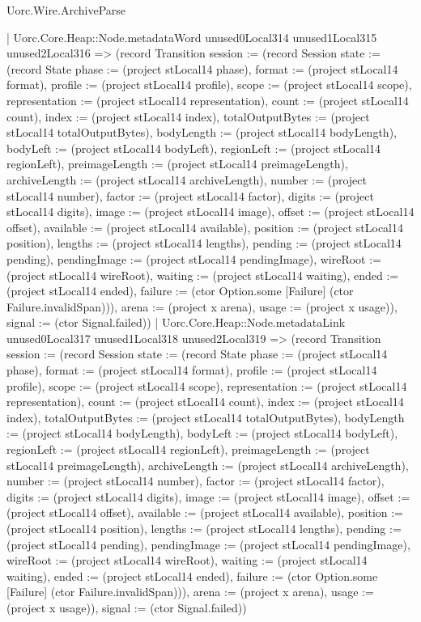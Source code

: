 \begin{lexlean}{Uorc.Wire.ArchiveParse}
\begin{semanticmodule}
{            | Uorc.Core.Heap::Node.metadataWord unused0Local314 unused1Local315 unused2Local316 => (record Transition {session := (record Session {state := (record State {phase := (project stLocal14 phase), format := (project stLocal14 format), profile := (project stLocal14 profile), scope := (project stLocal14 scope), representation := (project stLocal14 representation), count := (project stLocal14 count), index := (project stLocal14 index), totalOutputBytes := (project stLocal14 totalOutputBytes), bodyLength := (project stLocal14 bodyLength), bodyLeft := (project stLocal14 bodyLeft), regionLeft := (project stLocal14 regionLeft), preimageLength := (project stLocal14 preimageLength), archiveLength := (project stLocal14 archiveLength), number := (project stLocal14 number), factor := (project stLocal14 factor), digits := (project stLocal14 digits), image := (project stLocal14 image), offset := (project stLocal14 offset), available := (project stLocal14 available), position := (project stLocal14 position), lengths := (project stLocal14 lengths), pending := (project stLocal14 pending), pendingImage := (project stLocal14 pendingImage), wireRoot := (project stLocal14 wireRoot), waiting := (project stLocal14 waiting), ended := (project stLocal14 ended), failure := (ctor Option.some [Failure] (ctor Failure.invalidSpan))}), arena := (project x arena), usage := (project x usage)}), signal := (ctor Signal.failed)})
            | Uorc.Core.Heap::Node.metadataLink unused0Local317 unused1Local318 unused2Local319 => (record Transition {session := (record Session {state := (record State {phase := (project stLocal14 phase), format := (project stLocal14 format), profile := (project stLocal14 profile), scope := (project stLocal14 scope), representation := (project stLocal14 representation), count := (project stLocal14 count), index := (project stLocal14 index), totalOutputBytes := (project stLocal14 totalOutputBytes), bodyLength := (project stLocal14 bodyLength), bodyLeft := (project stLocal14 bodyLeft), regionLeft := (project stLocal14 regionLeft), preimageLength := (project stLocal14 preimageLength), archiveLength := (project stLocal14 archiveLength), number := (project stLocal14 number), factor := (project stLocal14 factor), digits := (project stLocal14 digits), image := (project stLocal14 image), offset := (project stLocal14 offset), available := (project stLocal14 available), position := (project stLocal14 position), lengths := (project stLocal14 lengths), pending := (project stLocal14 pending), pendingImage := (project stLocal14 pendingImage), wireRoot := (project stLocal14 wireRoot), waiting := (project stLocal14 waiting), ended := (project stLocal14 ended), failure := (ctor Option.some [Failure] (ctor Failure.invalidSpan))}), arena := (project x arena), usage := (project x usage)}), signal := (ctor Signal.failed)})
}
\end{semanticmodule}
\end{lexlean}
